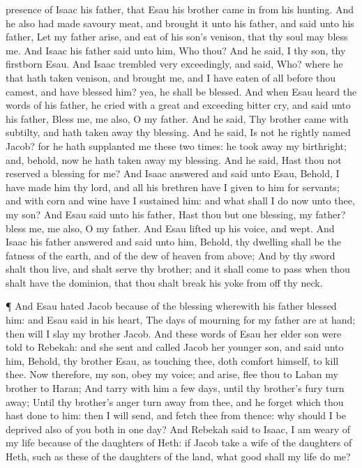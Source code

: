 {presence of
Isaac his
father, that
Esau his
brother came
in from his
hunting.
And he also had
made savoury
meat, and brought
it unto his
father, and
said unto his
father, Let my
father
arise, and
eat of his
son’s
venison, that thy
soul may
bless me.
And
Isaac his
father
said unto him, Who
{} thou? And he
said, I
{} thy
son, thy
firstborn
Esau.
And
Isaac
trembled
very
exceedingly, and
said, Who?
where
{} he that hath
taken
venison, and
brought
{} me, and I have
eaten of all before thou
camest, and have
blessed him? yea,
{} he shall be
blessed.
And when
Esau
heard the
words of his
father, he
cried with a
great and
exceeding
bitter
cry, and
said unto his
father,
Bless me,
{} me also, O my
father.
And he
said, Thy
brother
came with
subtilty, and hath taken
away thy
blessing.
And he
said, Is not he
rightly
named
Jacob? for he hath supplanted
me
these two
times: he took
away my
birthright; and, behold, now he hath taken
away my
blessing. And he
said, Hast thou not
reserved a
blessing for me?
And
Isaac
answered and
said unto
Esau, Behold, I have
made him thy
lord, and all his
brethren have I
given to him for
servants; and with
corn and
wine have I
sustained him: and what shall I
do
now unto thee, my
son?
And
Esau
said unto his
father, Hast thou but
one
blessing, my
father?
bless me,
{} me also, O my
father. And
Esau lifted
up his
voice, and
wept.
And
Isaac his
father
answered and
said unto him, Behold, thy
dwelling shall be the
fatness of the
earth, and of the
dew of
heaven from
above;
And by thy
sword shalt thou
live, and shalt
serve thy
brother; and it shall come to pass when thou shalt have the
dominion, that thou shalt
break his
yoke from off thy
neck.
\par }{\PP {}¶ And
Esau
hated
Jacob
because of the
blessing
wherewith his
father blessed
him: and
Esau
said in his
heart, The
days of
mourning for my
father are at
hand; then will I
slay my
brother
Jacob.
And these
words of
Esau her
elder
son were
told to
Rebekah: and she
sent and
called
Jacob her
younger
son, and
said unto him, Behold, thy
brother
Esau, as touching thee, doth
comfort himself,
{} to
kill thee.
Now therefore, my
son,
obey my
voice; and
arise,
flee thou to
Laban my
brother to
Haran;
And
tarry with him a
few
days,
until thy
brother’s
fury turn
away;
Until thy
brother’s
anger turn
away from thee, and he
forget
{} which thou hast
done to him: then I will
send, and
fetch thee from thence:
why should I be
deprived also of you
both in
one
day?
And
Rebekah
said to
Isaac, I am
weary of my
life
because of the
daughters of
Heth: if
Jacob
take a
wife of the
daughters of
Heth, such as these
{} of the
daughters of the
land, what
good shall my
life do me?

}
